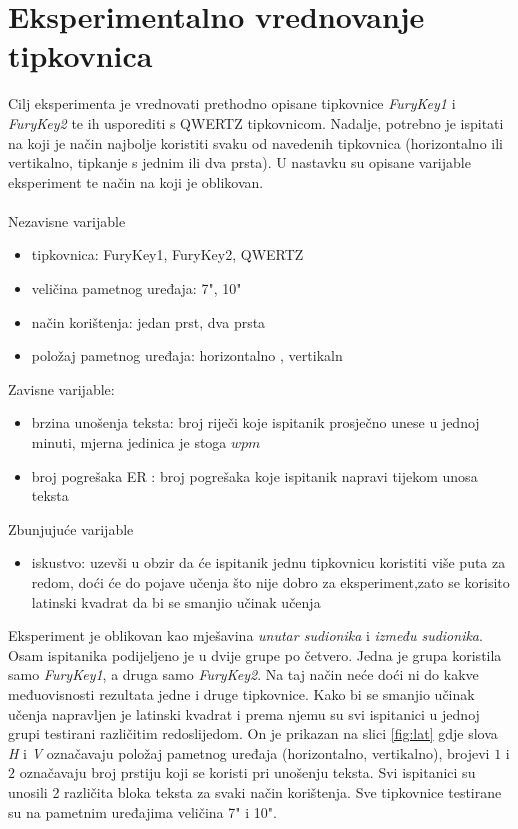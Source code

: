 \documentclass[times, utf8, zavrsni, numeric]{fer}
\begin{document}
\section{Eksperimentalno vrednovanje tipkovnica}
Cilj eksperimenta je vrednovati prethodno opisane tipkovnice \emph{FuryKey1} i \emph{FuryKey2} te ih usporediti s QWERTZ tipkovnicom. Nadalje, potrebno je ispitati na koji je način najbolje koristiti svaku od navedenih tipkovnica (horizontalno ili vertikalno, tipkanje s jednim ili dva prsta). U nastavku su opisane varijable eksperiment te način na koji je oblikovan.
\\\\Nezavisne varijable
\begin{itemize}
\item tipkovnica: FuryKey1, FuryKey2, QWERTZ
\item veličina pametnog uređaja: 7", 10"
\item način korištenja: jedan prst, dva prsta
\item položaj pametnog uređaja: horizontalno , vertikaln 
\end{itemize}
Zavisne varijable:
\begin{itemize}
\item brzina unošenja teksta: broj riječi koje ispitanik prosječno unese u jednoj minuti, mjerna jedinica je stoga $wpm$ 
\item broj pogrešaka ER : broj pogrešaka koje ispitanik napravi tijekom unosa teksta
\end{itemize}
Zbunjujuće varijable
\begin{itemize}
\item iskustvo: uzevši u obzir da će ispitanik jednu tipkovnicu koristiti više puta za redom, doći će do pojave učenja što nije dobro za eksperiment,zato se korisito latinski kvadrat da bi se smanjio učinak učenja\\
\end{itemize}
Eksperiment je oblikovan kao mješavina \emph{unutar sudionika} i \emph{između sudionika}. Osam ispitanika podijeljeno je u dvije grupe po četvero. Jedna je grupa koristila samo \emph{FuryKey1}, a druga samo \emph{FuryKey2}. Na taj način neće doći ni do kakve međuovisnosti rezultata jedne i druge tipkovnice. Kako bi se smanjio učinak učenja napravljen je latinski kvadrat i prema njemu su svi ispitanici u jednoj grupi testirani različitim redoslijedom. On je prikazan na slici \ref{fig:lat} gdje slova \emph{H} i \emph{V} označavaju položaj pametnog uređaja (horizontalno, vertikalno), brojevi $1$ i $2$ označavaju broj prstiju koji se koristi pri unošenju teksta. Svi ispitanici su unosili 2 različita bloka teksta za svaki način korištenja. Sve tipkovnice testirane su na pametnim uređajima veličina 7" i 10".
\end{document}
